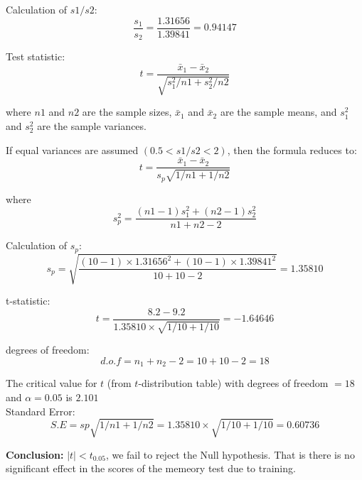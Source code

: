 \documentclass[a4paper,11pt,openright]{report}
\begin{document}
\begin{enumerate}
Calculation of $s1/s2$:
\begin{equation*}
\frac{s_{1}}{s_{2}} = \frac{1.31656}{1.39841} = 0.94147
\end{equation*}

Test statistic: 
\begin{equation*}
t = \frac{\bar x_{1} - \bar x_{2}}{\sqrt{s_{1}^{2}/n1 + s_{2}^{2}/n2}}
\end{equation*}

where $n1$ and $n2$ are the sample sizes, $\bar x_{1}$ and $\bar x_{2}$ are the sample
means, and $s_{1}^{2}$ and $s_{2}^{2}$ are the sample variances. 

If equal variances are assumed $(0.5 < s1/s2 < 2)$, then the formula reduces to:
\begin{equation*}
t = \frac{\bar x_{1} - \bar x_{2}}{s_{p} \sqrt{1/n1 + 1/n2}}
\end{equation*}

where
\begin{equation*}
s_{p}^{2} = \frac{(n1-1)s_{1}^{2} + (n2-1)s_{2}^{2}}{n1+n2-2}
\end{equation*}

Calculation of $s_{p}$:
\begin{equation*}
s_{p} = \sqrt{\frac{(10-1) \times 1.31656^{2} + (10-1) \times 1.39841^{2}}{10+10-2}} 
      = 1.35810
\end{equation*}

t-statistic:
\begin{equation*}
t = \frac{8.2 - 9.2}{1.35810 \times \sqrt{1/10 + 1/10}} = -1.64646
\end{equation*}

degrees of freedom:
\begin{equation*}
d.o.f = n_{1} + n_{2} - 2 = 10 + 10 - 2 = 18
\end{equation*}

The critical value for $t$ (from $t$-distribution table) with degrees of freedom $= 18$ and 
$\alpha = 0.05$ is $2.101$ \\

Standard Error:
\begin{equation*}
S.E = sp \sqrt{1/n1 + 1/n2} = 1.35810 \times \sqrt{1/10 + 1/10} = 0.60736
\end{equation*}

\textbf{Conclusion:} $|t| < t_{0.05}$, we fail to reject the Null hypothesis. That is there
is no significant effect in the scores of the memeory test due to training.

\vspace{0.5cm}


\end{enumerate}
\end{document}
